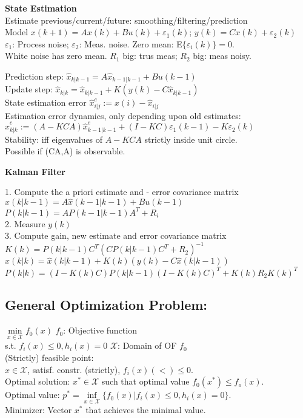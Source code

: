 \documentclass[10pt,parskip]{scrartcl}
\begin{document}
\begin{multicols*}{3}
\textbf{State Estimation}\\
Estimate previous/current/future: smoothing/filtering/prediction\\
Model $x(k+1) = A x(k) + B u(k) + \varepsilon_1(k)$; $y(k) = C x(k) + \varepsilon_2(k)$\\
$\varepsilon_1$: Process noise; $\varepsilon_2$: Meas. noise. Zero mean: E$\{\varepsilon_i(k) \}=0$.\\
White noise has zero mean. $R_1$ big: trus meas; $R_2$ big: meas noisy.


Prediction step: $\hat x_{k | k-1} = A\hat x_{k-1 | k-1} + B u(k-1)$\\
Update step: $\hat x_{k | k} = \hat x_{k | k-1} + K (y(k)-C\hat x_{k | k-1})$\\
State estimation error $ \hat x_{i | j}^e:= x(i) - \hat x_{i | j}$\\
Estimation error dynamics, only depending upon old estimates:\\
$ \hat x_{k | k}^e:= (A-K C A) \hat x_{k-1 | k-1}^e + (I-K C)\varepsilon_1(k-1) - K \varepsilon_2(k)$\\
Stability: iff eigenvalues of $ A- K C A$ strictly inside unit circle. \\
Possible if (CA,A) is observable.
 
\textbf{Kalman Filter}

1. Compute the a priori estimate and - error covariance matrix\\
$\hat x(k|k-1) = A \hat x(k-1|k-1) + B u(k-1)$\\
$P(k|k-1) = A P(k-1|k-1) A^T +R_i$\\
2. Measure $y(k)$\\
3. Compute gain, new estimate and error covariance matrix\\
$K(k) = P(k|k-1) C^T(C P(k|k-1)C^T + R_2)^{-1}$\\
$\hat x(k|k) = \hat x(k|k-1) + K(k)(y(k)-C \hat x(k|k-1))$\\
$P(k|k) = (I-K(k)C)P(k|k-1)(I-K(k)C)^T + K(k)R_2 K(k)^T$\\
\subsection{General Optimization Problem:}
\hspace*{8mm}$\min\limits_{x \in \mathcal X} f_0(x)$ \hspace*{32mm} $f_0$: Objective function\\
\hspace*{10mm}s.t. $f_i(x)\leq 0, h_i(x) = 0$ \hspace*{8mm} $\mathcal X$: Domain of OF $f_0$\\
(Strictly) feasible point:\\
 $x \in \mathcal X$, satisf. constr. (strictly), $f_i(x) (<) \leq 0$.\\
Optimal solution:
 $x^* \in \mathcal X$ such that optimal value $f_0(x^*)\leq f_o(x)$.\\
Optimal value: $p^* = \inf \limits_{x \in \mathcal X} \{f_0(x) | f_i(x) \leq 0, h_i(x) = 0\}$.\\
Minimizer: Vector $x^*$ that achieves the minimal value.


\end{multicols*}
\end{document}
